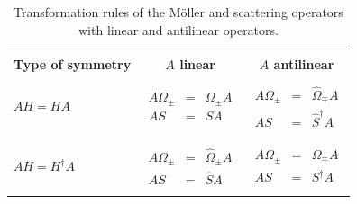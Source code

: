 \begin{table}
  \caption{Transformation rules of the M\"oller and scattering operators with linear and antilinear operators.}
  \label{tab:chapter1_MollerOperatorSymmetries}
  \centering
  \begin{tabular}{lcc}
  \hline\hline\\
  \textbf{Type of symmetry} & \textbf{$A$ linear} & \textbf{$A$ antilinear}

  \\
  \hline
  $A H = H A$
  &
  $
  \begin{array}{ccc}
    &&
    \\
    A \Omega_{\pm}&=&\Omega_{\pm} A
    \\
    A S&=&S A
    \\
    &&
  \end{array}
  $
  &
  $
  \begin{array}{ccc}
    &&
    \\
    A \Omega_{\pm}&=&\widehat{\Omega}_{\mp} A
    \\
    A S&=&\widehat{S}^\dagger A
    \\
    &&
  \end{array}
  $
  \\
  $A H = H^\dagger A$
  &
  $
  \begin{array}{ccc}
    &&
    \\
    A \Omega_{\pm}&=&\widehat{\Omega}_{\pm} A
    \\
    A S&=&\widehat{S} A
    \\
    &&
  \end{array}
  $
  &
  $
  \begin{array}{ccc}
    &&
    \\
    A \Omega_{\pm}&=&\Omega_{\mp} A
    \\
    A S&=&S^\dagger A
    \\
    &&
  \end{array}
  $
  \\
  \hline\hline
  \end{tabular}
\end{table}

